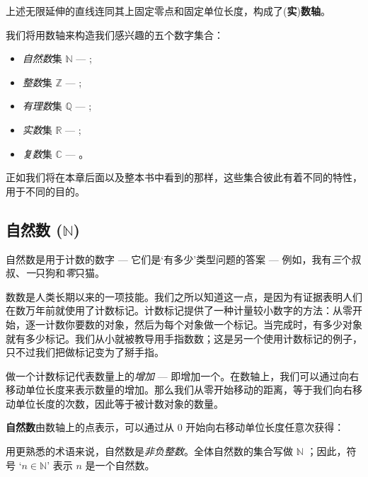 \begin{definition}
\label{defNumberLine}
上述无限延伸的直线连同其上固定零点和固定单位长度，构成了(\textbf{实})\textbf{数轴}。
\end{definition}

我们将用数轴来构造我们感兴趣的五个数字集合：
\begin{itemize}
\item \textit{自然数}集 $\mathbb{N}$ --- ;
\item \textit{整数}集 $\mathbb{Z}$ --- ;
\item \textit{有理数}集 $\mathbb{Q}$ --- ;
\item \textit{实数}集 $\mathbb{R}$ --- ;
\item \textit{复数}集 $\mathbb{C}$ --- 。
\end{itemize}

正如我们将在本章后面以及整本书中看到的那样，这些集合彼此有着不同的特性，用于不同的目的。

\subsection*{自然数 ($\mathbb{N}$)}

自然数是用于计数的数字 --- 它们是`有多少'类型问题的答案 --- 例如，我有\textit{三}个叔叔、\textit{一}只狗和\textit{零}只猫。

数数是人类长期以来的一项技能。我们之所以知道这一点，是因为有证据表明人们在数万年前就使用了计数标记。计数标记提供了一种计量较小数字的方法：从零开始，逐一计数你要数的对象，然后为每个对象做一个标记。当完成时，有多少对象就有多少标记。我们从小就被教导用手指数数；这是另一个使用计数标记的例子，只不过我们把做标记变为了掰手指。

做一个计数标记代表数量上的\textit{增加} --- 即增加一个。在数轴上，我们可以通过向右移动单位长度来表示数量的增加。那么我们从零开始移动的距离，等于我们向右移动单位长度的次数，因此等于被计数对象的数量。

\begin{definition}
\label{defNaturalNumbersInformal}
\textbf{自然数}由数轴上的点表示，可以通过从 $0$ 开始向右移动单位长度任意次获得：
\begin{center}
\end{center}
用更熟悉的术语来说，自然数是\textit{非负整数}。全体自然数的集合写做 $\mathbb{N}$ ；因此，符号 `$n \in \mathbb{N}$' 表示 $n$ 是一个自然数。
\end{definition}

